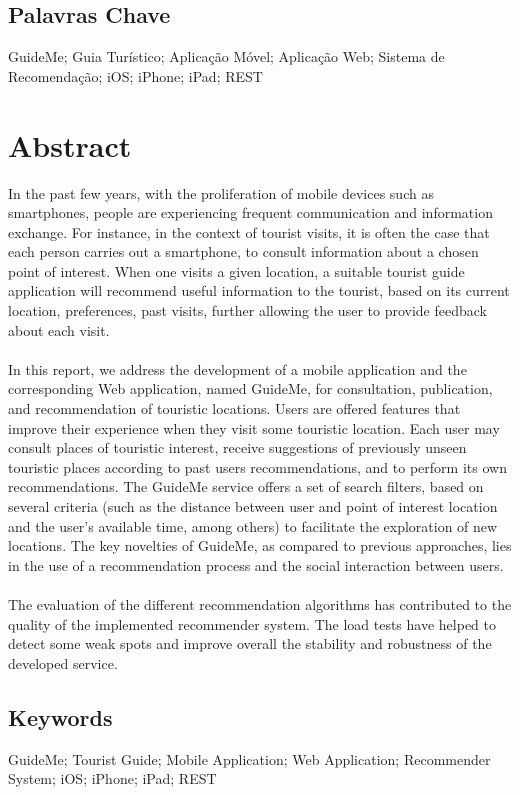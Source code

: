 \section*{Palavras Chave}
GuideMe; Guia Turístico; Aplicação Móvel; Aplicação Web; Sistema de Recomendação; iOS; iPhone; iPad; REST

\chapter*{Abstract}
In the past few years, with the proliferation of mobile devices such as smartphones, people are experiencing frequent communication and information exchange. For instance, in the context of tourist visits, it is often the case that each person carries out a smartphone, to consult information about a chosen point of interest. When one visits a given location, a suitable tourist guide application will recommend useful information to the tourist, based on its current location, preferences, past visits, further allowing the user to provide feedback about each visit.\\
\\
In this report, we address the development of a mobile application and the corresponding Web application, named GuideMe, for consultation, publication, and recommendation of touristic locations. Users are offered features that improve their experience when they visit some touristic location. Each user may consult places of touristic interest, receive suggestions of previously unseen touristic places according to past users recommendations, and to perform its own recommendations. The GuideMe service offers a set of search filters, based on several criteria (such as the distance between user and point of interest location and the user’s available time, among others) to facilitate the exploration of new locations. The key novelties of GuideMe, as compared to previous approaches, lies in the use of a recommendation process and the social interaction between users.\\
\\
The evaluation of the different recommendation algorithms has contributed to the quality of the implemented recommender system. The load tests have helped to detect some weak spots and improve overall the stability and robustness of the developed service.

\section*{Keywords}
GuideMe; Tourist Guide; Mobile Application; Web Application; Recommender System; iOS; iPhone; iPad; REST
